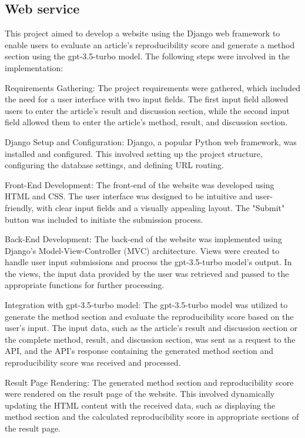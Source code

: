 \documentclass[12pt, a4paper, twocolumn]{article}
\begin{document}
		\subsection{Web service}
		This project aimed to develop a website using the Django web framework to enable users to evaluate an article's reproducibility score and generate a method section using the gpt-3.5-turbo model. The following steps were involved in the implementation:

Requirements Gathering: The project requirements were gathered, which included the need for a user interface with two input fields. The first input field allowed users to enter the article's result and discussion section, while the second input field allowed them to enter the article's method, result, and discussion section.

Django Setup and Configuration: Django, a popular Python web framework, was installed and configured. This involved setting up the project structure, configuring the database settings, and defining URL routing.

Front-End Development: The front-end of the website was developed using HTML and CSS. The user interface was designed to be intuitive and user-friendly, with clear input fields and a visually appealing layout. The "Submit" button was included to initiate the submission process.

Back-End Development: The back-end of the website was implemented using Django's Model-View-Controller (MVC) architecture. Views were created to handle user input submissions and process the gpt-3.5-turbo model's output. In the views, the input data provided by the user was retrieved and passed to the appropriate functions for further processing.

Integration with gpt-3.5-turbo model: The gpt-3.5-turbo model was utilized to generate the method section and evaluate the reproducibility score based on the user's input. The input data, such as the article's result and discussion section or the complete method, result, and discussion section, was sent as a request to the API, and the API's response containing the generated method section and reproducibility score was received and processed.

Result Page Rendering: The generated method section and reproducibility score were rendered on the result page of the website. This involved dynamically updating the HTML content with the received data, such as displaying the method section and the calculated reproducibility score in appropriate sections of the result page.
\end{document}
